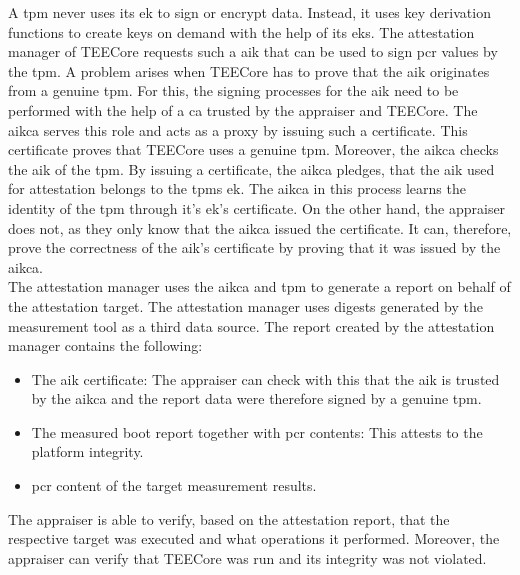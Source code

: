 A \gls{tpm} never uses its \gls{ek} to sign or encrypt data. Instead, it uses
key derivation functions to create keys on demand with the help of its
\glspl{ek}. The attestation manager of TEECore requests such a \gls{aik} that
can be used to sign \gls{pcr} values by the \gls{tpm}. A problem arises when
TEECore has to prove that the \gls{aik} originates from a genuine \gls{tpm}. For
this, the signing processes for the \gls{aik} need to be performed with the help
of a \gls{ca} trusted by the appraiser and TEECore. The \gls{aikca} serves this
role and acts as a proxy by issuing such a certificate. This certificate proves
that TEECore uses a genuine \gls{tpm}. Moreover, the \gls{aikca} checks the
\gls{aik} of the \gls{tpm}. By issuing a certificate, the \gls{aikca} pledges,
that the \gls{aik} used for attestation belongs to the \gls{tpm}s \gls{ek}.
The \gls{aikca} in this process learns the identity of the \gls{tpm} through
it's \gls{ek}'s certificate. On the other hand, the appraiser does not, as they
only know that the \gls{aikca} issued the certificate. It can, therefore, prove
the correctness of the \gls{aik}'s certificate by proving that it was issued by
the \gls{aikca}.\\

The attestation manager uses the \gls{aikca} and \gls{tpm} to generate a report
on behalf of the attestation target. The attestation manager uses digests
generated by the measurement tool as a third data source. The report created by
the attestation manager contains the following:
\begin{itemize}
  \item The \gls{aik} certificate: The appraiser can check with this that the
    \gls{aik} is trusted by the \gls{aikca} and the report data were
    therefore signed by a genuine \gls{tpm}.
  \item The measured boot report together with \gls{pcr} contents: This attests
    to the platform integrity.
  \item \gls{pcr} content of the target measurement results.
\end{itemize}

The appraiser is able to verify, based on the attestation report, that the
respective target was executed and what operations it performed. Moreover, the
appraiser can verify that TEECore was run and its integrity was not
violated.


